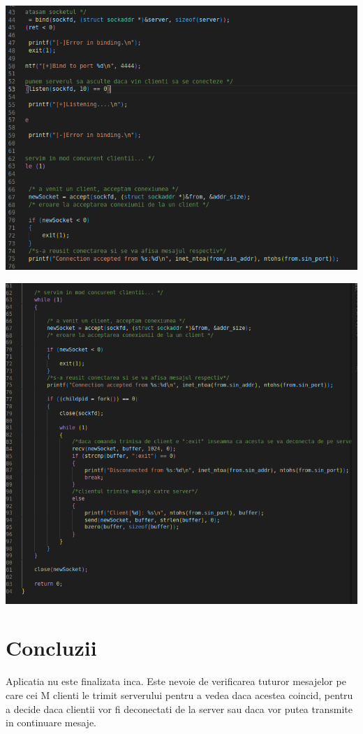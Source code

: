 \documentclass{article}
\begin{document}
    \includegraphics[width=\textwidth]{cod2.png}


  \includegraphics[width=\textwidth]{cod3.png}


\section{Concluzii}
Aplicatia nu este finalizata inca. Este nevoie de verificarea tuturor mesajelor pe care cei M clienti le trimit serverului pentru a vedea daca acestea coincid, pentru a decide daca  clientii vor fi deconectati de la server sau daca vor putea transmite in continuare mesaje. 
\end{document}
